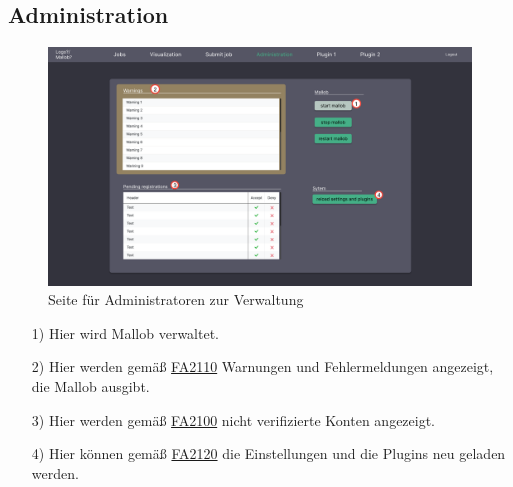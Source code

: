 \subsection{Administration}
\label{pages:admin}
\begin{figure}[H]
    \centering
    \includegraphics[width=\textwidth]{images-interface/v3_interface/admin_page_v3.pdf}
    \caption{Seite für Administratoren zur Verwaltung}
    \label{fig:admin-page}
\end{figure}
\begin{itemize}
    \item[1)] Hier wird Mallob verwaltet.
    \item[2)] Hier werden gemäß \hyperref[FA:Web-Interface:Anzeigen von Warungen und Fehlermeldungen]{FA2110} Warnungen und Fehlermeldungen angezeigt, die Mallob ausgibt.
    \item[3)] Hier werden gemäß \hyperref[FA:Web-Interface:Verifizieren eines Kontos]{FA2100} nicht verifizierte Konten angezeigt.
    \item[4)] Hier können gemäß \hyperref[FA:Web-Interface:Aktualisieren]{FA2120} die Einstellungen und die Plugins neu geladen werden.
\end{itemize}

